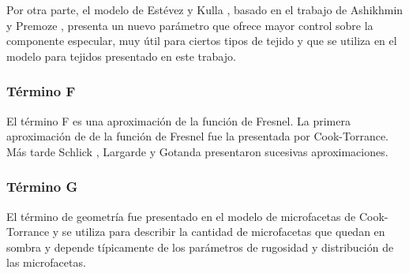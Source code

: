                 Por otra parte, el modelo de Est\'evez y Kulla \autocite{sheenbrdf}, basado en el trabajo de Ashikhmin y Premoze \autocite{ashikhmin00},
                presenta un nuevo par\'ametro que ofrece mayor control sobre la componente especular, muy \'util para ciertos tipos de
                tejido y que se utiliza en el modelo para tejidos presentado en este trabajo.\\


            

            \subsubsection*{T\'ermino F}
                El t\'ermino F es una aproximaci\'on de la funci\'on de Fresnel. La primera aproximaci\'on de de la funci\'on de Fresnel
                fue la presentada por Cook-Torrance. M\'as tarde Schlick \autocite{schlick}, Largarde \autocite{frostbite} y Gotanda \autocite{gotanda}
                presentaron sucesivas aproximaciones.

            \subsubsection*{T\'ermino G}
                El t\'ermino de geometr\'ia fue presentado en el modelo de microfacetas de Cook-Torrance \autocite{cooktorrance}
                y se utiliza para describir la cantidad de microfacetas que quedan en sombra y depende t\'ipicamente de los par\'ametros
                de rugosidad y distribuci\'on de las microfacetas.\\
                
